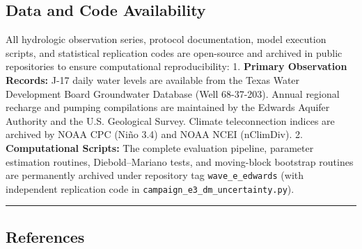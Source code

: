 \documentclass[11pt]{article}
\begin{document}
\subsection{Data and Code
Availability}\label{data-and-code-availability}

All hydrologic observation series, protocol documentation, model
execution scripts, and statistical replication codes are open-source and
archived in public repositories to ensure computational reproducibility:
1. \textbf{Primary Observation Records:} J-17 daily water levels are
available from the Texas Water Development Board Groundwater Database
(Well 68-37-203). Annual regional recharge and pumping compilations are
maintained by the Edwards Aquifer Authority and the U.S. Geological
Survey. Climate teleconnection indices are archived by NOAA CPC (Niño
3.4) and NOAA NCEI (nClimDiv). 2. \textbf{Computational Scripts:} The
complete evaluation pipeline, parameter estimation routines,
Diebold--Mariano tests, and moving-block bootstrap routines are
permanently archived under repository tag \texttt{wave\_e\_edwards}
(with independent replication code in
\texttt{campaign\_e3\_dm\_uncertainty.py}).

\begin{center}\rule{0.5\linewidth}{0.5pt}\end{center}

\subsection{References}\label{references}
\end{document}
